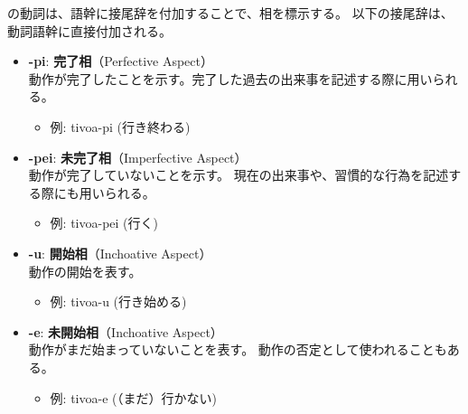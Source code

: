 \langname の動詞は、語幹に接尾辞を付加することで、相を標示する。
以下の接尾辞は、動詞語幹に直接付加される。

\begin{itemize}

    \item \textbf{-pi}: \textbf{完了相}（Perfective Aspect）\\
    動作が完了したことを示す。完了した過去の出来事を記述する際に用いられる。
    \begin{itemize}
        \item 例: tivoa-pi (行き終わる)
    \end{itemize}

    \item \textbf{-pei}: \textbf{未完了相}（Imperfective Aspect）\\
    動作が完了していないことを示す。
    現在の出来事や、習慣的な行為を記述する際にも用いられる。
    \begin{itemize}
    \item 例: tivoa-pei (行く)
    \end{itemize}

    \item \textbf{-u}: \textbf{開始相}（Inchoative Aspect）\\
    動作の開始を表す。
    \begin{itemize}
        \item 例: tivoa-u (行き始める)
    \end{itemize}

    \item \textbf{-e}: \textbf{未開始相}（Inchoative Aspect）\\
    動作がまだ始まっていないことを表す。
    動作の否定として使われることもある。
    \begin{itemize}
        \item 例: tivoa-e (（まだ）行かない)
    \end{itemize}

\end{itemize}